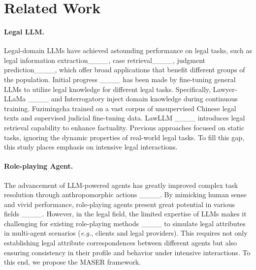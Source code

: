\section{Related Work}
\paragraph{Legal LLM.}
Legal-domain LLMs have achieved astounding performance on legal tasks, such as legal information extraction____, case retrieval____, judgment prediction____, 
which offer broad applications that benefit different groups of the population.
Initial progress ____ has been made by fine-tuning general LLMs to utilize legal knowledge for different legal tasks.
Specifically, Lawyer-LLaMa ____ and Interrogatory inject domain knowledge during continuous training. 
Fuzimingcha trained on a vast corpus of unsupervised Chinese legal texts and supervised judicial fine-tuning data.
LawLLM ____ introduces legal retrieval capability to enhance factuality.
Previous approaches focused on static tasks, ignoring the dynamic properties of real-world legal tasks. To fill this gap, this study places emphasis on intensive legal interactions.


\paragraph{Role-playing Agent.}
The advancement of LLM-powered agents has greatly improved complex task resolution through anthropomorphic actions ____.
By mimicking human sense and vivid performance, role-playing agents present great potential in various fields ____.
However, in the legal field, the limited expertise of LLMs makes it challenging for existing role-playing methods ____ to simulate legal attributes in multi-agent scenarios (\textit{e.g.}, clients and legal providers). This requires not only establishing legal attribute correspondences between different agents but also ensuring consistency in their profile and behavior under intensive interactions. To this end, we propose the MASER framework.


